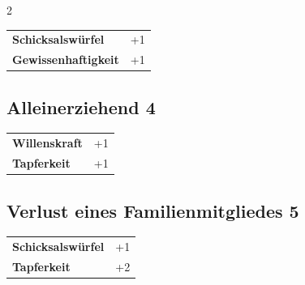 \begin{multicols}{2}
\begin{tcolorbox}
\vspace{3mm}

\begin{tabular}{@{}ll@{}}
    \textbf{Schicksalswürfel} & +1\\
    \textbf{Gewissenhaftigkeit} & +1\\
\end{tabular}


\end{tcolorbox}

\begin{tcolorbox}
    \subsection*{Alleinerziehend \hfill \small{4 }}
    \tcblower




\begin{tabular}{@{}ll@{}}
    \textbf{Willenskraft} & +1\\
    \textbf{Tapferkeit} & +1\\
\end{tabular}


\end{tcolorbox}

\begin{tcolorbox}
    \subsection*{Verlust eines Familienmitgliedes \hfill \small{5 }}
    \tcblower




\begin{tabular}{@{}ll@{}}
    \textbf{Schicksalswürfel} & +1\\
    \textbf{Tapferkeit} & +2\\
\end{tabular}


\end{tcolorbox}


\end{multicols}
